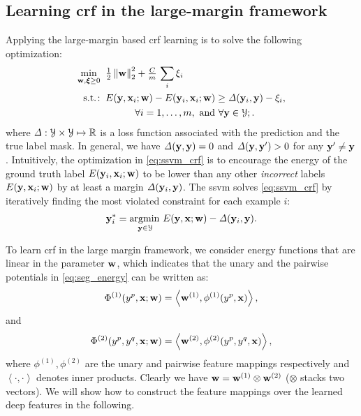\documentclass[10pt,3p]{elsarticle}
\def\half{{\tfrac{1}{2} }}
\def\argmin{\operatorname*{argmin\,}}
\def\Real{\mathbb{R}}
\newcommand{\ssvm}{{\sc ssvm}\xspace}
\newcommand{\crf}{{\sc crf}\xspace}
\def\bw{{\bf w}}
\def\bx{{\bf x}}
\def\by{{\bf y}}
\def\bh{{ \Phi }}
\let\x\bx
\let\y\by
\let\w\bw
\def\z{{\bf y}'}
\def\bxi{{\boldsymbol \xi}}
\def\calY{{\cal Y}}
\def\loss{{\it \Delta}}
\newcommand{\st}{{{\rm s.t.}\!:}\xspace}
\newcommand{\fnorm}[2][2]{\ensuremath{ \left\| #2 \right\|_{ \mathrm{#1} } } }
\begin{document}
\subsection{Learning \crf in the large-margin framework}
Applying the large-margin based \crf learning is to solve the following optimization:
\begin{align}
  \min_{\bw, \bxi \geq 0}   \;\; &
        \half \fnorm{\bw}^2 +  {\tfrac{C}{m}} \, \sum_i \xi_i \notag \\
  \st  \;\; &
    E(\y, \x_i; \w)- E (\y_i, \x_i; \w )\geq
    \loss ( \y_i, \y) - \xi_i, \notag \\
   & \quad\quad\quad
   \forall i=1, \dots, m,
   \text{ and }\forall \y \in  {\cal Y};.
\label{eq:ssvm_crf}
\end{align}
where $\loss: \calY \times \calY \mapsto \Real$ is a loss function associated with the prediction and the true label mask.  In general, we have $ \loss( \y, \y ) = 0$ and $ \loss(\y, \z ) > 0 $ for any $ \z \neq \y $.
Intuitively, the optimization in \eqref{eq:ssvm_crf} is to encourage the
energy of the ground truth label $E(\y_i,\x_i; \w)$ to be lower than any other
{\em incorrect} labels $E(\y, \x_i; \w)$ by at least a margin $\loss (
\y_i, \y)$. The \ssvm solves \eqref{eq:ssvm_crf} by iteratively finding the most violated constraint for each example $i$:
\begin{align}
\y_i^{*}=\argmin_{ \y \in  {\cal Y}} E(\y, \x; \w) - \loss(\y_i, \y).
\label{eq:inf_crf}
\end{align}

To learn \crf in the large margin framework, we consider energy functions that are linear in the parameter $\w$, which indicates that the unary and the pairwise potentials in \eqref{eq:seg_energy} can be written as:
\begin{align}
\bh^{(1)}(y^{p}, \x;\w) = \left\langle\w^{(1)}, \phi^{(1)}(y^p, \x)\right\rangle,
\end{align}
and
\begin{align}
\bh^{(2)}(y^{p}, y^{q}, \x;\w) = \left\langle \w^{(2)}, \phi^{(2)}(y^{p}, y^{q}, \x) \right\rangle,
\end{align}
where $\phi^{(1)}, \phi^{(2)}$ are the unary and pairwise feature mappings respectively and $\left\langle \cdot, \cdot \right\rangle$ denotes inner products. Clearly we have $\w=\w^{(1)}\otimes\w^{(2)}$ ($\otimes$ stacks two vectors).
We will show how to construct the feature mappings over the learned deep features in the following.
%

%
%
\end{document}
